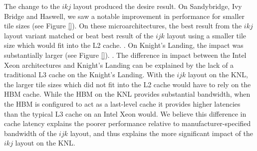 \documentclass{sig-alternate-05-2015}
\begin{document}

The change to the \(ikj\) layout produced the desire result. On Sandybridge,
Ivy Bridge and Haswell, we saw a notable improvement in performance for smaller
tile sizes (see Figure \ref{}). On these microarchitectures, the best result
from the \(ikj\) layout variant matched or beat best result of the \(ijk\)
layout using a smaller tile size which would fit into the L2 cache.
. On Knight's Landing, the impact was substantially
larger (see Figure \ref{}). . The difference in impact
between the Intel Xeon architectures and Knight's Landing can be explained by
the lack of a traditional L3 cache on the Knight's Landing. With the \(ijk\)
layout on the KNL, the larger tile sizes which did not fit into the L2 cache would
have to rely on the HBM cache. While the HBM on the KNL provides substantial
bandwidth, when the HBM is configured to act as a last-level cache it provides
higher latencies than the typical L3 cache on an Intel Xeon would. We believe
this difference in cache latency explains the poorer performance relative to
manufacturer-specified bandwidth of the \(ijk\) layout, and thus explains the
more significant impact of the \(ikj\) layout on the KNL.
\end{document}
